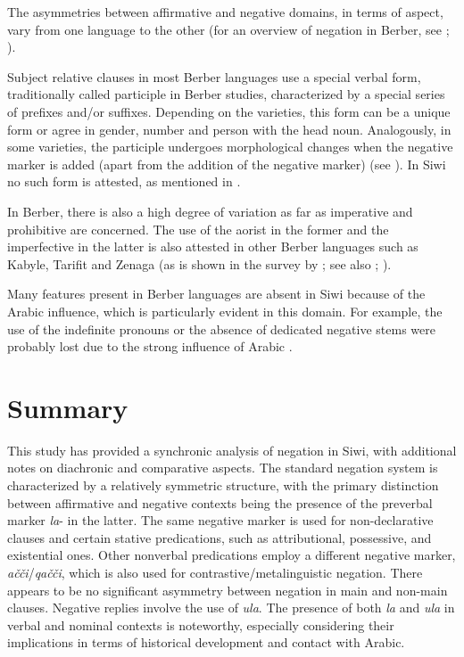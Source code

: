 \documentclass[output=paper,colorlinks,citecolor=brown]{langscibook}
\begin{document}
The asymmetries between affirmative and negative domains, in terms of aspect, vary from one language to the other (for an overview of negation in Berber, see \citealt{Chaker1996}; \citealt{Mettouchi2009,Mettouchi2010,Mettouchi2012,Mettouchi2021}).

Subject relative clauses in most Berber languages use a special verbal form, traditionally called participle in Berber studies, characterized by a special series of prefixes and/or suffixes. Depending on the varieties, this form can be a unique form or agree in gender, number and person with the head noun. Analogously, in some varieties, the participle undergoes morphological changes when the negative marker is added (apart from the addition of the negative marker) (see \citealt{Mettouchi2017}). In Siwi no such form is attested, as mentioned in .

In Berber, there is also a high degree of variation as far as imperative and prohibitive are concerned. The use of the aorist in the former and the imperfective in the latter is also attested in other Berber languages such as Kabyle, Tarifit and Zenaga (as is shown in the survey by \citealt[68--71]{Mettouchi2021}; see also \citealt{Lafkioui1996}; \citealt{TaineCheikh2011}). 

Many features present in Berber languages are absent in Siwi because of the Arabic influence, which is particularly evident in this domain. For example, the use of the indefinite pronouns or the absence of dedicated negative stems were probably lost due to the strong influence of Arabic \citep[212]{Souag2013}. 

\newpage
\section{Summary}\label{sec:siw:5}


This study has provided a synchronic analysis of negation in Siwi, with additional notes on diachronic and comparative aspects. The standard negation system is characterized by a relatively symmetric structure, with the primary distinction between affirmative and negative contexts being the presence of the preverbal marker \textit{la}- in the latter. The same negative marker is used for non-declarative clauses and certain stative predications, such as attributional, possessive, and existential ones. Other nonverbal predications employ a different negative marker, \textit{ačči}/\textit{qačči}, which is also used for contrastive/metalinguistic negation. There appears to be no significant asymmetry between negation in main and non-main clauses. Negative replies involve the use of \textit{ula}. The presence of both \textit{la} and \textit{ula} in verbal and nominal contexts is noteworthy, especially considering their implications in terms of historical development and contact with Arabic.
\end{document}
